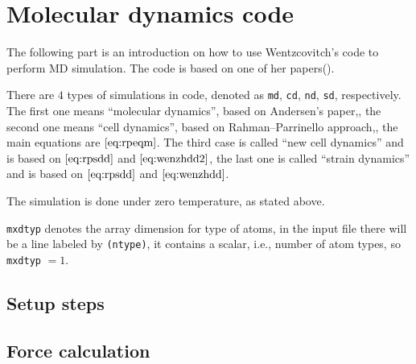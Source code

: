 
\section{Molecular dynamics code}

The following part is an introduction on how to use
Wentzcovitch's code to perform MD simulation. The code is
based on one of her papers(\cite{Wentzcovitch:1991ka}).

There are $4$ types of simulations in code,
denoted as \texttt{md}, \texttt{cd}, \texttt{nd}, \texttt{sd},
respectively. The first one means ``molecular dynamics'',
based on Andersen's paper,\cite{Andersen:1980ew},
the second one means ``cell dynamics'', based on
Rahman–Parrinello approach,\cite{Parrinello:1980kx},
the main equations are $\eqref{eq:rpeqm}$.
The third case is called ``new cell dynamics'' and is based on
$\eqref{eq:rpsdd}$ and $\eqref{eq:wenzhdd2}$,
the last one is called ``strain dynamics'' and is based on
$\eqref{eq:rpsdd}$ and $\eqref{eq:wenzhdd}$.

The simulation is done under zero temperature, as stated above.

\texttt{mxdtyp} denotes the array dimension for type of atoms,
in the input file there will be a line labeled by \texttt{(ntype)}, it
contains a scalar, i.e., number of atom types, so \texttt{mxdtyp} $=1$.



\subsection{Setup steps}











\subsection{Force calculation}








